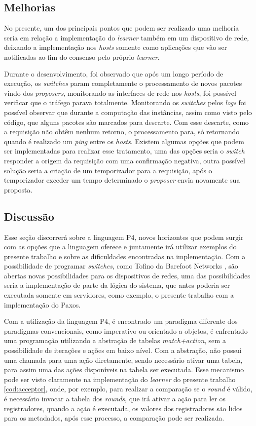 \documentclass[
    12pt,
    openright, 
    oneside,
    a4paper,
    french,
    english,
    brazil
    ]{facom-ufu-abntex2}
\theoremstyle{definition}
\begin{document}
\subsection{Melhorias}
No presente, um dos principais pontos que podem ser realizado uma melhoria seria em relação a implementação do \emph{learner}
também em um dispositivo de rede, deixando a implementação nos \emph{hosts} somente como aplicações que vão ser notificadas
ao fim do consenso pelo próprio \emph{learner}.

Durante o desenvolvimento, foi observado que após um longo período de execução, os \emph{switches} param completamente o
processamento de novos pacotes vindo dos \emph{proposers}, monitorando as interfaces de rede nos \emph{hosts}, foi possível 
verificar que o tráfego parava totalmente. Monitorando os \emph{switches} pelos \emph{logs} foi possível observar que durante a
computação das instâncias, assim como visto pelo código, que alguns pacotes são marcados para descarte. Com esse descarte, como a requisição
não obtêm nenhum retorno, o processamento para, só retornando quando é realizado um \emph{ping} entre os \emph{hosts}.
Existem algumas opções que podem ser implementadas para realizar esse tratamento, uma das opções seria o \emph{switch}
responder a origem da requisição com uma confirmação negativa, outra possível solução seria a criação de um temporizador para
a requisição, após o temporizador exceder um tempo determinado o \emph{proposer} envia novamente sua proposta.

\subsection{Discussão}
Esse seção discorrerá sobre a linguagem P4, novos horizontes que podem surgir com as opções que a linguagem oferece e juntamente
irá utilizar exemplos do presente trabalho e sobre as dificuldades encontradas na implementação. Com a possibilidade de programar
\emph{switches}, como Tofino da Barefoot Networks \cite{tofinoSwitch}, são abertas novas possibilidades para os dispositivos de redes,
uma das possibilidades seria a implementação de parte da lógica do sistema, que antes poderia ser executada somente em servidores, como
exemplo, o presente trabalho com a implementação do Paxos.

Com a utilização da linguagem P4, é encontrado um paradigma diferente dos paradigmas convencionais, como imperativo ou orientado a objetos,
é enfrentado uma programação utilizando a abstração de tabelas \emph{match+action}, sem a possibilidade de iterações e ações em baixo
nível. Com a abstração, não possui uma chamada para uma ação diretamente, sendo necessário ativar uma tabela, para assim uma das ações
disponíveis na tabela ser executada. Esse mecanismo pode ser visto claramente na implementação do \emph{learner} do presente trabalho
\ref{cod:acceptor}, onde, por exemplo, para realizar a comparação se o \emph{round} é válido, é necessário invocar a tabela dos \emph{rounds},
que irá ativar a ação para ler os registradores, quando a ação é executada, os valores dos registradores são lidos para os metadados, após
esse processo, a comparação pode ser realizada.
\end{document}
